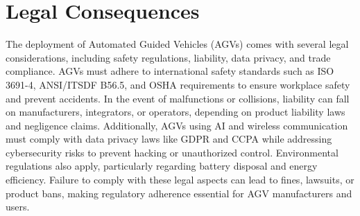 \documentclass[../../main]{subfiles}
\begin{document}
\section{Legal Consequences}

The deployment of Automated Guided Vehicles (AGVs) comes with several legal considerations, including safety regulations, 
liability, data privacy, and trade compliance. AGVs must adhere to international safety standards such as ISO 3691-4, 
ANSI/ITSDF B56.5\cite{ANSIITSDFB56.5}, and OSHA requirements\cite{OSHArequirements} to ensure workplace safety and prevent accidents. In the event of malfunctions or collisions, 
liability can fall on manufacturers, integrators, or operators, depending on product liability laws and negligence claims.
Additionally, AGVs using AI and wireless communication must comply with data privacy laws like GDPR\cite{GDPR} and CCPA \cite{CCPA} while addressing
cybersecurity risks to prevent hacking or unauthorized control. Environmental regulations also apply, particularly regarding 
battery disposal and energy efficiency. Failure to comply with these legal aspects can lead to fines, lawsuits, or product bans, 
making regulatory adherence essential for AGV manufacturers and users.
\end{document}
